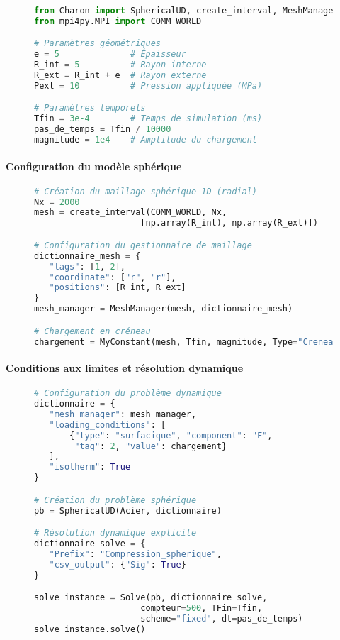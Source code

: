 \documentclass[10pt]{book}
\begin{document}
\begin{figure}[h!]
\begin{lstlisting}[language=python]
from Charon import SphericalUD, create_interval, MeshManager
from mpi4py.MPI import COMM_WORLD

# Paramètres géométriques
e = 5              # Épaisseur
R_int = 5          # Rayon interne
R_ext = R_int + e  # Rayon externe
Pext = 10          # Pression appliquée (MPa)

# Paramètres temporels
Tfin = 3e-4        # Temps de simulation (ms)
pas_de_temps = Tfin / 10000
magnitude = 1e4    # Amplitude du chargement
\end{lstlisting}
\end{figure}

\paragraph{Configuration du modèle sphérique}

\begin{figure}[h!]
\begin{lstlisting}[language=python]
# Création du maillage sphérique 1D (radial)
Nx = 2000
mesh = create_interval(COMM_WORLD, Nx, 
                     [np.array(R_int), np.array(R_ext)])

# Configuration du gestionnaire de maillage
dictionnaire_mesh = {
   "tags": [1, 2], 
   "coordinate": ["r", "r"], 
   "positions": [R_int, R_ext]
}
mesh_manager = MeshManager(mesh, dictionnaire_mesh)

# Chargement en créneau
chargement = MyConstant(mesh, Tfin, magnitude, Type="Creneau")
\end{lstlisting}
\end{figure}

\paragraph{Conditions aux limites et résolution dynamique}

\begin{figure}[h!]
\begin{lstlisting}[language=python]
# Configuration du problème dynamique
dictionnaire = {
   "mesh_manager": mesh_manager,
   "loading_conditions": [
       {"type": "surfacique", "component": "F", 
        "tag": 2, "value": chargement}
   ],
   "isotherm": True
}

# Création du problème sphérique
pb = SphericalUD(Acier, dictionnaire)

# Résolution dynamique explicite
dictionnaire_solve = {
   "Prefix": "Compression_spherique",
   "csv_output": {"Sig": True}
}

solve_instance = Solve(pb, dictionnaire_solve, 
                     compteur=500, TFin=Tfin, 
                     scheme="fixed", dt=pas_de_temps)
solve_instance.solve()
\end{lstlisting}
\end{figure}
\end{document}
